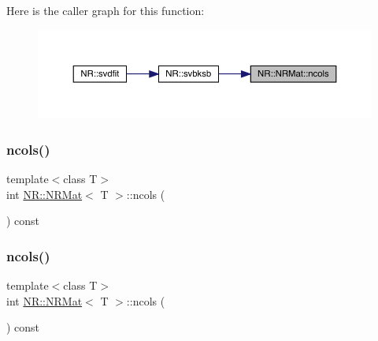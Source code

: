 Here is the caller graph for this function\+:
\nopagebreak
\begin{figure}[H]
\begin{center}
\leavevmode
\includegraphics[width=350pt]{da/d92/classNR_1_1NRMat_ad6c5ecfb47d80c934bedeb7ea395fd84_icgraph}
\end{center}
\end{figure}
\mbox{\label{classNR_1_1NRMat_ad6c5ecfb47d80c934bedeb7ea395fd84}} 
\subsubsection{\texorpdfstring{ncols()}{ncols()}\hspace{0.1cm}{\footnotesize\ttfamily [2/3]}}
{\footnotesize\ttfamily template$<$class T$>$ \\
int \mbox{\hyperlink{classNR_1_1NRMat}{N\+R\+::\+N\+R\+Mat}}$<$ T $>$\+::ncols (\begin{DoxyParamCaption}{ }\end{DoxyParamCaption}) const\hspace{0.3cm}{\ttfamily [inline]}}

\mbox{\label{classNR_1_1NRMat_ad6c5ecfb47d80c934bedeb7ea395fd84}} 
\subsubsection{\texorpdfstring{ncols()}{ncols()}\hspace{0.1cm}{\footnotesize\ttfamily [3/3]}}
{\footnotesize\ttfamily template$<$class T$>$ \\
int \mbox{\hyperlink{classNR_1_1NRMat}{N\+R\+::\+N\+R\+Mat}}$<$ T $>$\+::ncols (\begin{DoxyParamCaption}{ }\end{DoxyParamCaption}) const\hspace{0.3cm}{\ttfamily [inline]}}

